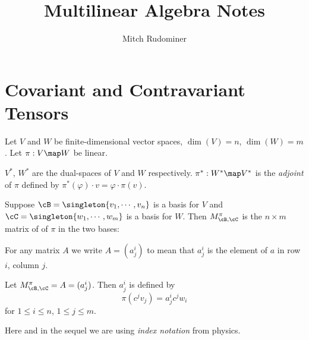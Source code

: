 \documentclass[oneside,12pt]{amsart}
\begin{document}
\title{Multilinear Algebra Notes}
\author{Mitch Rudominer}

\maketitle

\tableofcontents


\section{Covariant and Contravariant Tensors}

Let $V$ and $W$ be finite-dimensional vector spaces, 
$\dim(V)=n$, $\dim(W) = m$. Let $\pi:V\map W$ be linear.

\begin{definition}
$V^*$, $W^*$ are the dual-spaces of $V$ and $W$ respectively.
$\pi^*:W^*\map V^*$ is the \emph{adjoint} of $\pi$ defined by
$\pi^*(\varphi) \cdot v = \varphi \cdot \pi(v)$.
\end{definition}

\begin{definition}
Suppose $\cB = \singleton{v_1,\cdots,v_n}$ is a basis for $V$ and
$\cC=\singleton{w_1,\cdots,w_m}$ is a basis for $W$.
Then $M^{\pi}_{\cB,\cC}$ is the $n\times m$ matrix of of $\pi$ in
the two bases:

 For any matrix $A$ we write $A=(a^i_j)$ to mean that $a^i_j$ is the
 element of $a$ in row $i$, column $j$. 

 Let $M^{\pi}_{\cB,\cC}=A=(a^i_j)$.
Then $a^i_j$ is defined by
$$\pi(c^jv_j) = a^i_j c^j w_i$$
for $1\leq i \leq n$, $1\leq j \leq m$.

Here and in the sequel we are using \emph{index notation} from physics.

\end{definition}
\end{document}
